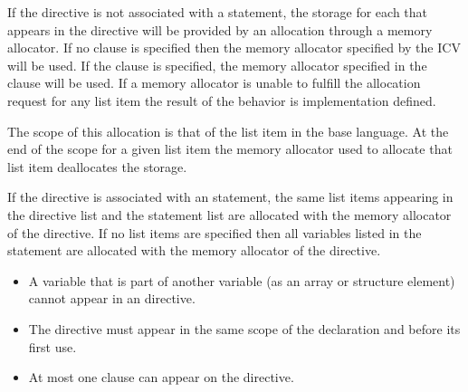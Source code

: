 \descr

If the directive is not associated with a statement, the storage for each  that appears in the directive will be provided by an allocation through a memory allocator. If no clause is specified then the memory allocator specified by the  ICV will be used. If the  clause is specified, the memory allocator specified in the clause will be used. If a memory allocator is unable to fulfill the allocation request for any list item the result of the behavior is implementation defined.

The scope of this allocation is that of the list item in the base language. At the end of the scope for a given list item the memory allocator used to allocate that list item deallocates the storage.

\begin{fortranspecific}
If the directive is associated with an  statement, the same list items appearing in the directive list and the  statement list are allocated with the memory allocator of the directive.
If no list items are specified then all variables listed in the  statement are allocated with the memory allocator of the directive.
\end{fortranspecific}

\restrictions
\begin{itemize}
\item A variable that is part of another variable (as an array or structure element) cannot appear in an  directive.
\item The directive must appear in the same scope of the  declaration and before its first use.
\item At most one  clause can appear on the  directive.
\end{itemize}

